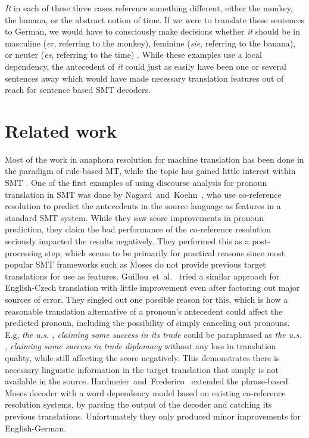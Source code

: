 \documentclass[11pt]{article}
\begin{document}
\emph{It} in each of these three cases reference something different, either the monkey, the banana, or the abstract notion of time. If we were to translate these sentences to German, we would have to consciously make decisions whether \emph{it} should be in masculine (\emph{er}, referring to the monkey), feminine (\emph{sie}, referring to the banana), or neuter (\emph{es}, referring to the time) \cite{Mitkov1995Anaphora}. While these examples use a local dependency, the antecedent of \emph{it} could just as easily have been one or several sentences away which would have made necessary translation features out of reach for sentence based SMT decoders.


\section{Related work}


Most of the work in anaphora resolution for machine translation has been done in the paradigm of rule-based MT, while the topic has gained little interest within SMT \cite{Hardmeier2010Modelling,Mitkov1999Introduction}.
One of the first examples of using discourse analysis for pronoun translation in SMT was done by Nagard~and~Koehn~, who use co-reference resolution to predict the antecedents in the source language as features in a standard SMT system.
While they saw score improvements in pronoun prediction, they claim the bad performance of the co-reference resolution seriously impacted the results negatively.
They performed this as a post-processing step, which seems to be primarily for practical reasons since most popular SMT frameworks such as Moses \cite{Koehn2007Moses} do not provide previous target translations for use as features.
Guillou~et~al.~ tried a similar approach for English-Czech translation with little improvement even after factoring out major sources of error. They singled out one possible reason for this, which is how a reasonable translation alternative of a pronoun's antecedent could affect the predicted pronoun, including the possibility of simply canceling out pronouns. E.g, \emph{the u.s. , claiming some success in its trade} could be paraphrased as \emph{the u.s. , claiming some success in trade diplomacy} without any loss in translation quality, while still affecting the score negatively.
This demonstrates there is necessary linguistic information in the target translation that simply is not available in the source.
Hardmeier~and~Frederico~ extended the phrase-based Moses decoder with a word dependency model based on existing co-reference resolution systems, by parsing the output of the decoder and catching its previous translations.
Unfortunately they only produced minor improvements for English-German.
\end{document}
